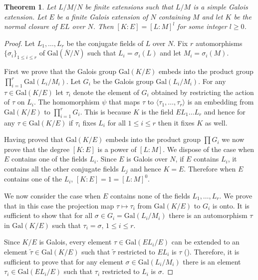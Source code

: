 \documentclass[11pt]{madras}%
\newtheorem{theorem}{Theorem}[chapter]
\theoremstyle{remark}
\newcommand{\Gal}[1]{{\ensuremath{\mathrm{Gal}\left(#1\right)}}}
\begin{document}
\begin{theorem}\label{thm-power-simple-extension}
  Let $L/M/N$ be finite extensions such that $L/M$ is a simple Galois
  extension. Let $E$ be a finite Galois extension of $N$ containing
  $M$ and let $K$ be the normal closure of $EL$ over $N$. Then $[K:E]
  = [L:M]^l$ for some integer $l \geq 0$.
\end{theorem}
\begin{proof}
  Let $L_1,\ldots,L_r$ be the conjugate fields of $L$ over $N$. Fix
  $r$ automorphisms $\{ \sigma_i \}_{1\leq i\leq r}$ of
  $\Gal{\overline{N}/N}$ such that $L_i = \sigma_i(L)$ and let $M_i =
  \sigma_i(M)$.

  First we prove that the Galois group $\Gal{K/E}$ embeds into the
  product group $\prod_{i=1}^r \Gal{L_i/M_i}$.  Let $G_i$ be the
  Galois group $\Gal{L_i/M_i}$. For any $\tau \in \Gal{K/E}$ let
  $\tau_i$ denote the element of $G_i$ obtained by restricting the
  action of $\tau$ on $L_i$. The homomorphism $\psi$ that maps $\tau$
  to $\langle \tau_1,\ldots,\tau_r \rangle$ is an embedding from
  $\Gal{K/E}$ to $\prod_{i=1}^r G_i$. This is because $K$ is the field
  $EL_1\ldots L_r$ and hence for any $\tau \in \Gal{K/E}$ if $\tau_i$
  fixes $L_i$ for all $1 \leq i \leq r$ then it fixes $K$ as well.

  Having proved that $\Gal{K/E}$ embeds into the product group
  $\prod G_i$ we now prove that the degree $[K:E]$ is a power of
  $[L:M]$.  We dispose of the case when $E$ contains one of the fields
  $L_i$.  Since $E$ is Galois over $N$, if $E$ contains $L_i$, it
  contains all the other conjugate fields $L_j$ and hence $K = E$.
  Therefore when $E$ contains one of the $L_i$, $[K:E] = 1 = [L:M]^0$.

  We now consider the case when $E$ contains none of the fields
  $L_1,\ldots,L_r$.  We prove that in this case the projection map
  $\tau \mapsto \tau_i$ from $\Gal{K/E}$ to $G_i$ is onto.  It is
  sufficient to show that for all $\sigma \in G_i = \Gal{L_i/M_i}$
  there is an automorphism $\tau$ in $\Gal{K/E}$ such that $\tau_i =
  \sigma$, $1 \leq i \leq r$.
  
  Since $K/E$ is Galois, every element $\tau \in \Gal{EL_i/E}$ can be
  extended to an element $\tilde{\tau} \in \Gal{K/E}$ such that
  $\tilde{\tau}$ restricted to $EL_i$ is $\tau$ (\cite[Theorem 2.8,
  Chapter V]{lang:algebra}). Therefore, it is sufficient to prove that
  for any element $\sigma \in \Gal{L_i/M_i}$ there is an element
  $\tau_i \in \Gal{EL_i/E}$ such that $\tau_i$ restricted to $L_i$ is
  $\sigma$.


\end{proof}
\end{document}
